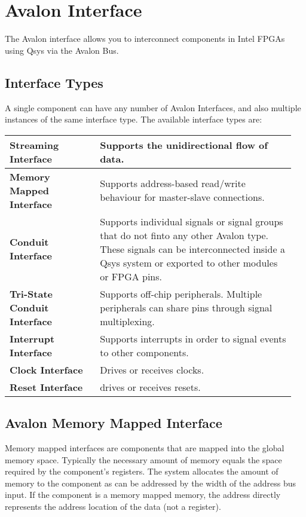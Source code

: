 \section{Avalon Interface}
	The Avalon interface allows you to interconnect components in Intel FPGAs using Qsys via the Avalon Bus.
	
	\subsection{Interface Types }
		A single component can have any number of Avalon Interfaces, and also multiple instances of the same interface type. The available interface types are:
			\begin{longtable}{|>{\bfseries}p{0.3\linewidth}|p{0.65\linewidth}|}
				\hline
				Streaming Interface
					& Supports the unidirectional flow of data.\\
				\hline
				Memory Mapped Interface
					& Supports address-based read/write behaviour for master-slave connections.\\
				\hline
				Conduit Interface
					& Supports individual signals or signal groups that do not finto any other Avalon type.
					These signals can be interconnected inside a Qsys system or exported to other modules or FPGA pins.\\
				\hline
				Tri-State Conduit Interface
					& Supports off-chip peripherals. Multiple peripherals can share pins through signal multiplexing.\\
				\hline
				Interrupt Interface
					& Supports interrupts in order to signal events to other components.\\
				\hline
				Clock Interface
					& Drives or receives clocks.\\
				\hline
				Reset Interface
					& drives or receives resets.\\
				\hline	
			\end{longtable}
		
	\subsection{Avalon Memory Mapped Interface }
		Memory mapped interfaces are components that are mapped into the global memory space. Typically the necessary amount of memory equals the space required by the component's registers. The system allocates the amount of memory to the component as can be addressed by the width of the address bus input. If the component is a memory mapped memory, the address directly represents the address location of the data (not a register).
			

